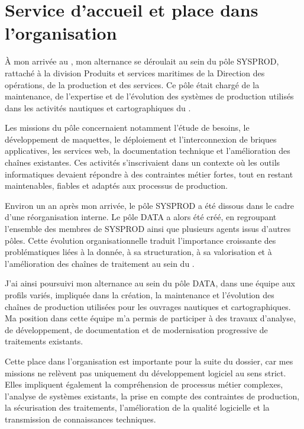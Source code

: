 \section{Service d'accueil et place dans l'organisation}

À mon arrivée au , mon alternance se déroulait au sein du pôle SYSPROD, rattaché à la division Produits et services maritimes de la Direction des opérations, de la production et des services. Ce pôle était chargé de la maintenance, de l'expertise et de l'évolution des systèmes de production utilisés dans les activités nautiques et cartographiques du .

Les missions du pôle concernaient notamment l'étude de besoins, le développement de maquettes, le déploiement et l'interconnexion de briques applicatives, les services web, la documentation technique et l'amélioration des chaînes existantes. Ces activités s'inscrivaient dans un contexte où les outils informatiques devaient répondre à des contraintes métier fortes, tout en restant maintenables, fiables et adaptés aux processus de production.

Environ un an après mon arrivée, le pôle SYSPROD a été dissous dans le cadre d'une réorganisation interne. Le pôle DATA a alors été créé, en regroupant l'ensemble des membres de SYSPROD ainsi que plusieurs agents issus d'autres pôles. Cette évolution organisationnelle traduit l'importance croissante des problématiques liées à la donnée, à sa structuration, à sa valorisation et à l'amélioration des chaînes de traitement au sein du .

J'ai ainsi poursuivi mon alternance au sein du pôle DATA, dans une équipe aux profils variés, impliquée dans la création, la maintenance et l'évolution des chaînes de production utilisées pour les ouvrages nautiques et cartographiques. Ma position dans cette équipe m'a permis de participer à des travaux d'analyse, de développement, de documentation et de modernisation progressive de traitements existants.

Cette place dans l'organisation est importante pour la suite du dossier, car mes missions ne relèvent pas uniquement du développement logiciel au sens strict. Elles impliquent également la compréhension de processus métier complexes, l'analyse de systèmes existants, la prise en compte des contraintes de production, la sécurisation des traitements, l'amélioration de la qualité logicielle et la transmission de connaissances techniques.